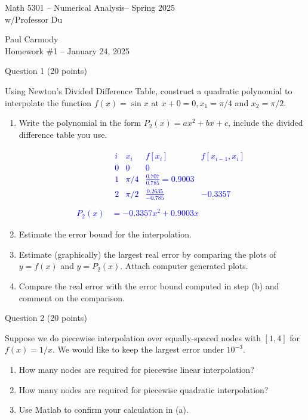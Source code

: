 \documentclass[10pt,a4paper]{report}
\newcommand{\CLASSNAME}{Math 5301 -- Numerical Analysis}
\newcommand{\STUDENTNAME}{Paul Carmody}
\newcommand{\ASSIGNMENT}{Homework \#1 }
\newcommand{\DUEDATE}{January 24, 2025}
\newcommand{\SEMESTER}{Spring 2025}
\newcommand{\BLUE}[1]{\textcolor{blue}{#1}}
\begin{document}
\begin{center}
	\Large{\CLASSNAME -- \SEMESTER} \\
	\large{ w/Professor Du}
\end{center}
\begin{center}
	\STUDENTNAME \\
	\ASSIGNMENT -- \DUEDATE\\
\end{center} 

Question 1 (20 points)
\vspace{1 em}

Using Newton's Divided Difference Table, construct a quadratic polynomial to interpolate the function $f(x) = \sin x$ at $x+0=0, x_1=\pi/4$ and $x_2=\pi/2$.
\begin{enumerate}[label=(\alph*)]

	\item Write the polynomial in the form $P_2(x)=ax^2+bx+c$, include the divided difference table you use.
	
	\BLUE{\begin{align*}
			&\begin{array}{cccc}
				\hline 
				i & x_i & f[x_i] & f[x_{i-1},x_i] \\
				\hline
				0 & 0 & 0 \\
				1 & \pi/4 & \frac{0.707}{0.785} = 0.9003\\
				2 & \pi/2 & \frac{0.2635}{-0.785}& -0.3357
			\end{array}\\ \\
			P_2(x) &= -0.3357x^2+0.9003x
		\end{align*}	
	}
	\item Estimate the error bound for the interpolation.
	\item Estimate (graphically) the largest real error by comparing the plots of $y=f(x)$ and $y=P_2(x)$.  Attach computer generated plots.
	\item Compare the real error with the error bound computed in step (b) and comment on the comparison.

\end{enumerate}
\vspace{1 em}

Question 2 (20 points)
\vspace{1 em}

Suppose we do piecewise interpolation over equally-spaced nodes with $[1,4]$ for $f(x)=1/x$.  We would like to keep the largest error under $10^{-3}$.

\begin{enumerate}[label=(\alph*)]

	\item How many nodes are required for piecewise linear interpolation?
	
	\item How many nodes are required for piecewise quadratic interpolation?
	
	\item Use Matlab to confirm your calculation in (a).

\end{enumerate}
\end{document}
